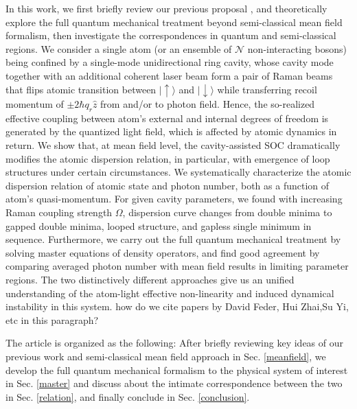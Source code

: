 \documentclass[atoms,article,submit,moreauthors,pdftex,12pt,a4paper]{mdpi}
\begin{document}
In this work, we first briefly review our previous proposal \cite{cavitySOC}, and theoretically explore the full quantum mechanical treatment beyond semi-classical mean field formalism, then investigate the correspondences in quantum and semi-classical regions. We consider a single atom (or an ensemble of $\mathcal{N}$ non-interacting  bosons) being confined by a single-mode unidirectional ring cavity, whose cavity mode together with an additional coherent laser beam form a pair of Raman beams that flips atomic transition between $|\uparrow\rangle$ and $|\downarrow\rangle$ while transferring recoil momentum of $\pm2\hbar q_r\hat{z}$ from and/or to photon field. Hence, the so-realized effective coupling between atom's external and internal degrees of freedom is generated by the quantized light field, which is affected by atomic dynamics in return. 
We show that, at mean field level, the cavity-assisted SOC dramatically modifies the atomic dispersion relation, in particular, with emergence of loop structures under certain circumstances. We systematically characterize the atomic dispersion relation of atomic state and photon number, both as a function of atom's quasi-momentum. For given cavity parameters, we found with increasing Raman coupling strength $\Omega$, dispersion curve changes from double minima to gapped double minima, looped structure, and gapless single minimum in sequence. Furthermore, we carry out the full quantum mechanical treatment by solving master equations of density operators, and find good agreement by comparing averaged photon number with mean field results in limiting parameter regions. The two distinctively different approaches give us an unified understanding of the atom-light effective non-linearity and induced dynamical instability in this system. {\color{red} how do we cite papers by David Feder, Hui Zhai,Su Yi, etc in this paragraph?}

The article is organized as the following: After briefly reviewing key ideas of our previous work and semi-classical mean field approach in Sec. \ref{meanfield}, we develop the full quantum mechanical formalism to the physical system of interest in Sec. \ref{master} and discuss about the intimate correspondence between the two in Sec. \ref{relation}, and finally conclude in Sec. \ref{conclusion}. 
\end{document}
